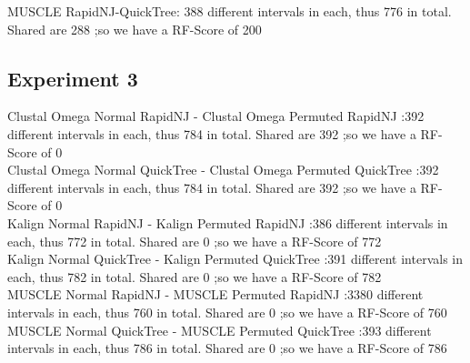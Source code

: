 \documentclass[12pt,a4paper]{article}
\begin{document}
    MUSCLE RapidNJ-QuickTree: 388 different intervals in each, thus 776 in total. Shared are  288 ;so we have a RF-Score of 200
    \subsection{Experiment 3}
    Clustal Omega Normal RapidNJ - Clustal Omega Permuted RapidNJ :392 different intervals in each, thus 784 in total. Shared are  392 ;so we have a RF-Score of 0 \\
    Clustal Omega Normal QuickTree - Clustal Omega Permuted QuickTree :392 different intervals in each, thus 784 in total. Shared are  392 ;so we have a RF-Score of 0 \\
    
    Kalign Normal RapidNJ - Kalign Permuted RapidNJ :386 different intervals in each, thus 772 in total. Shared are  0 ;so we have a RF-Score of 772 \\
    Kalign Normal QuickTree - Kalign Permuted QuickTree :391 different intervals in each, thus 782 in total. Shared are  0 ;so we have a RF-Score of 782 \\

    MUSCLE Normal RapidNJ - MUSCLE Permuted RapidNJ :3380 different intervals in each, thus 760 in total. Shared are  0 ;so we have a RF-Score of 760 \\
    MUSCLE Normal QuickTree - MUSCLE Permuted QuickTree :393 different intervals in each, thus 786 in total. Shared are  0 ;so we have a RF-Score of 786 \\
\end{document}
